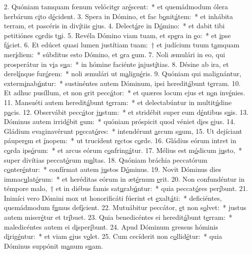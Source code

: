 2. Quóniam tamquam fœnum velócit\uline{e}r ar\uline{é}scent:~* et quemádmodum ólera herbárum c\uline{i}to d\uline{é}cident.
3. Spera in Dómino, et fac b\uline{o}nit\uline{á}tem:~* et inhábita terram, et pascéris in div\uline{í}tiis \uline{e}jus.
4. Delect\uline{á}re in D\uline{ó}mino:~* et dabit tibi petitiónes c\uline{o}rdis t\uline{u}i.
5. Revéla Dómino viam tuam, et sp\uline{e}ra in \uline{e}o:~* et \uline{i}pse f\uline{á}ciet.
6. Et edúcet quasi lumen justítiam tuam:~† et judícium tuum t\uline{a}mquam mer\uline{í}diem:~* súbditus esto Dómino, et \uline{o}ra \uline{e}um.
7. Noli æmulári in eo, qui prosperátur in v\uline{i}a s\uline{u}a:~* in hómine faciénte \uline{i}njust\uline{í}tias.
8. Désine ab ira, et derel\uline{í}nque fur\uline{ó}rem:~* noli æmulári ut m\uline{a}lign\uline{é}ris.
9. Quóniam qui malignántur, exterm\uline{i}nab\uline{ú}ntur:~* sustinéntes autem Dóminum, ipsi heredit\uline{á}bunt t\uline{e}rram.
10. Et adhuc pusíllum, et non \uline{e}rit pecc\uline{á}tor:~* et quæres locum ejus et n\uline{o}n inv\uline{é}nies.
11. Mansuéti autem heredit\uline{á}bunt t\uline{e}rram:~* et delectabúntur in multit\uline{ú}dine p\uline{a}cis.
12. Observábit pecc\uline{á}tor j\uline{u}stum:~* et stridébit super eum d\uline{é}ntibus s\uline{u}is.
13. Dóminus autem irrid\uline{é}bit \uline{e}um:~* quóniam próspicit quod véniet d\uline{i}es \uline{e}jus.
14. Gládium evaginavérunt p\uline{e}ccat\uline{ó}res:~* intendérunt \uline{a}rcum s\uline{u}um,
15. Ut dejíciant páuper\uline{e}m et \uline{í}nopem:~* ut trucídent r\uline{e}ctos c\uline{o}rde.
16. Gládius eórum intret in c\uline{o}rda ips\uline{ó}rum:~* et arcus eórum c\uline{o}nfring\uline{á}tur.
17. Mélius est m\uline{ó}dicum j\uline{u}sto,~* super divítias peccat\uline{ó}rum m\uline{u}ltas.
18. Quóniam bráchia peccatórum c\uline{o}nter\uline{é}ntur:~* confírmat autem j\uline{u}stos D\uline{ó}minus.
19. Novit Dóminus dies immac\uline{u}lat\uline{ó}rum:~* et heréditas eórum in æt\uline{é}rnum \uline{e}rit.
20. Non confundéntur in témpore malo,~† et in diébus famis sat\uline{u}rab\uline{ú}ntur:~* quia peccat\uline{ó}res per\uline{í}bunt.
21. Inimíci vero Dómini mox ut honorificáti fúerint et \uline{e}xalt\uline{á}ti:~* deficiéntes, quemádmodum f\uline{u}mus def\uline{í}cient.
22. Mutuábitur peccátor, \uline{e}t non s\uline{o}lvet:~* justus autem miser\uline{é}tur et tr\uline{í}buet.
23. Quia benedicéntes ei heredit\uline{á}bunt t\uline{e}rram:~* maledicéntes autem ei d\uline{i}sper\uline{í}bunt.
24. Apud Dóminum gressus hóminis d\uline{i}rig\uline{é}ntur:~* et viam \uline{e}jus v\uline{o}let.
25. Cum cecíderit non c\uline{o}llid\uline{é}tur:~* quia Dóminus suppónit m\uline{a}num s\uline{u}am.
